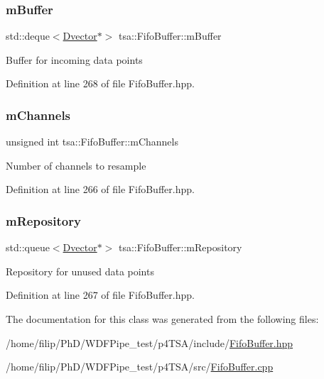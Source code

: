 \subsubsection{\texorpdfstring{m\+Buffer}{mBuffer}}
{\footnotesize\ttfamily std\+::deque$<$\hyperlink{namespacetsa_a8900fb03d849baf447a1a0efe2561fb2}{Dvector}$\ast$$>$ tsa\+::\+Fifo\+Buffer\+::m\+Buffer\hspace{0.3cm}{\ttfamily [private]}}

Buffer for incoming data points 

Definition at line 268 of file Fifo\+Buffer.\+hpp.

\mbox{\label{classtsa_1_1_fifo_buffer_add6db36d6910a8b1efba4b2439f4b9c5}} 
\subsubsection{\texorpdfstring{m\+Channels}{mChannels}}
{\footnotesize\ttfamily unsigned int tsa\+::\+Fifo\+Buffer\+::m\+Channels\hspace{0.3cm}{\ttfamily [private]}}

Number of channels to resample 

Definition at line 266 of file Fifo\+Buffer.\+hpp.

\mbox{\label{classtsa_1_1_fifo_buffer_a538034e48a1c598fbbde1fefb9e92f91}} 
\subsubsection{\texorpdfstring{m\+Repository}{mRepository}}
{\footnotesize\ttfamily std\+::queue$<$\hyperlink{namespacetsa_a8900fb03d849baf447a1a0efe2561fb2}{Dvector}$\ast$$>$ tsa\+::\+Fifo\+Buffer\+::m\+Repository\hspace{0.3cm}{\ttfamily [private]}}

Repository for unused data points 

Definition at line 267 of file Fifo\+Buffer.\+hpp.



The documentation for this class was generated from the following files\+:\begin{DoxyCompactItemize}
\item 
/home/filip/\+Ph\+D/\+W\+D\+F\+Pipe\+\_\+test/p4\+T\+S\+A/include/\hyperlink{_fifo_buffer_8hpp}{Fifo\+Buffer.\+hpp}\item 
/home/filip/\+Ph\+D/\+W\+D\+F\+Pipe\+\_\+test/p4\+T\+S\+A/src/\hyperlink{_fifo_buffer_8cpp}{Fifo\+Buffer.\+cpp}\end{DoxyCompactItemize}
